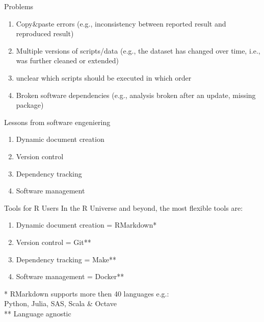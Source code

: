 \documentclass[12pt,t]{beamer}
\begin{document}
{\begin{frame}[c]{Problems}
  \begin{enumerate}
    \item<1->\textcolor<6>{lolit}{Copy\&paste errors (e.g., inconsistency between reported result and reproduced result)}
    \item<2->\textcolor<6>{lolit}{Multiple versions of scripts/data (e.g., the dataset has changed over time, i.e., was further cleaned or extended)}
    \item<3->\textcolor<5>{lolit}{unclear which scripts should be executed in which order}
    \item<4->\textcolor<5>{lolit}{Broken software dependencies (e.g., analysis broken after an update, missing package)}
  \end{enumerate}
\end{frame}

\begin{frame}[c]{Lessons from software engeniering}
  \begin{enumerate}
    \item \textcolor<2>{lolit}{Dynamic document creation}
    \item \textcolor<2>{lolit}{Version control}
    \item \textcolor<1>{lolit}{Dependency tracking}
    \item \textcolor<1>{lolit}{Software management}
  \end{enumerate}
  \vfill
\end{frame}

\begin{frame}[c]{Tools for R Users}
  In the R Universe and beyond, the most flexible tools are:
  \begin{enumerate}
    \item Dynamic document creation = RMarkdown*
    \item Version control = Git**
    \item \textcolor{hilit}{Dependency tracking = Make**}
    \item \textcolor{vhilit}{Software management = Docker**}
  \end{enumerate}
  \vfill
  \textcolor{lolit}{
	* RMarkdown supports more then 40 languages e.g.:\\
	\hspace{10mm}Python, Julia, SAS, Scala \& Octave\\
	** Language agnostic
	}
\end{frame}

}
\end{document}

